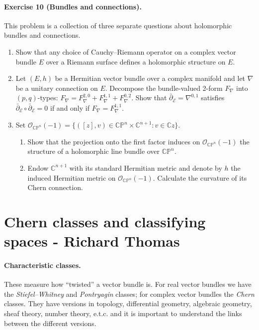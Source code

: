 \documentclass{article}
\theoremstyle{definition}
\renewcommand{\O}{\mathcal{O}}
\newcommand{\E}{\mathcal{E}}
\newcommand{\CP}{\mathbb{CP}}
\newcommand{\C}{\mathbb{C}}
\begin{document}
\paragraph{Exercise 10 {\normalfont(Bundles and connections)}.} This problem is
a collection of three separate questions about holomorphic bundles and
connections.
\begin{enumerate}[label=(\roman*)]
    \item Show that any choice of Cauchy--Riemann operator on a complex vector
        bundle $E$ over a Riemann surface defines a holomorphic structure on
        $E$.

    \item Let $(E,h)$ be a Hermitian vector bundle over a complex manifold and
        let $\nabla$ be a unitary connection on $E$. Decompose the bundle-valued
        2-form $F_\nabla$ into $(p,q)$-types:
        $F_\nabla=F^{2,0}_\nabla+F^{1,1}_\nabla+F^{0,2}_\nabla$. Show that
        $\bar\partial_\E=\nabla^{0,1}$ satisfies
        $\bar\partial_\E\circ\bar\partial_\E=0$ if and only if
        $F_\nabla=F^{1,1}_\nabla$.

    \item Set $\O_{\CP^n}(-1)=\{([z],v)\in\CP^n\times\C^{n+1}:v\in\C z\}$.
        \begin{enumerate}[label=(\alph*)]
            \item Show that the projection onto the first factor induces on
                $\O_{\CP^n}(-1)$ the structure of a holomorphic line bundle over
                $\CP^n$.

            \item Endow $\C^{n+1}$ with its standard Hermitian metric and denote
                by $h$ the induced Hermitian metric on $\O_{\CP^n}(-1)$.
                Calculate the curvature of its Chern connection.
        \end{enumerate}
\end{enumerate}

\newpage

\section{Chern classes and classifying spaces - Richard Thomas}

\paragraph{Characteristic classes.} These measure how ``twisted'' a vector
bundle is. For real vector bundles we have the \emph{Stiefel--Whitney} and
\emph{Pontryagin} classes; for complex vector bundles the \emph{Chern} classes.
They have versions in topology, differential geometry, algebraic geometry, sheaf
theory, number theory, e.t.c. and it is important to understand the links
between the different versions.
\end{document}

